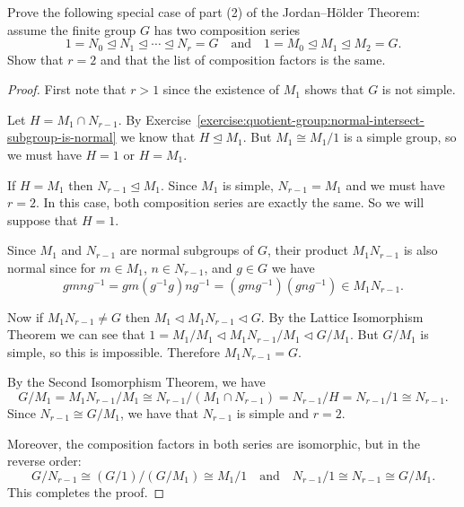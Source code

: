  Prove the following special case of part (2) of the
Jordan--H\"older Theorem: assume the finite group $G$ has two
composition series
\begin{equation*}
  1 = N_0 \trianglelefteq N_1 \trianglelefteq\cdots\trianglelefteq
  N_r = G \quad\text{and}\quad
  1 = M_0\trianglelefteq M_1\trianglelefteq M_2 = G.
\end{equation*}
Show that $r = 2$ and that the list of composition factors is the
same.
\begin{proof}
  First note that $r > 1$ since the existence of $M_1$ shows that $G$
  is not simple.

  Let $H = M_1\cap N_{r-1}$. By
  Exercise~\ref{exercise:quotient-group:normal-intersect-subgroup-is-normal}
  we know that $H\trianglelefteq M_1$. But $M_1\cong M_1/1$ is a simple
  group, so we must have $H = 1$ or $H = M_1$.

  If $H = M_1$ then $N_{r-1}\trianglelefteq M_1$. Since $M_1$ is
  simple, $N_{r-1} = M_1$ and we must have $r = 2$. In this case, both
  composition series are exactly the same. So we will suppose that
  $H = 1$.

  Since $M_1$ and $N_{r-1}$ are normal subgroups of $G$, their product
  $M_1N_{r-1}$ is also normal since for $m\in M_1$, $n\in N_{r-1}$,
  and $g\in G$ we have
  \begin{equation*}
    gmng^{-1} = gm(g^{-1}g)ng^{-1} = (gmg^{-1})(gng^{-1}) \in M_1N_{r-1}.
  \end{equation*}

  Now if $M_1N_{r-1}\neq G$ then
  $M_1\triangleleft M_1N_{r-1}\triangleleft G$. By the Lattice
  Isomorphism Theorem we can see that
  $1 = M_1/M_1 \triangleleft M_1N_{r-1}/M_1 \triangleleft G/M_1$. But
  $G/M_1$ is simple, so this is impossible. Therefore
  $M_1N_{r-1} = G$.

  By the Second Isomorphism Theorem, we have
  \begin{equation*}
    G/M_1 = M_1N_{r-1}/M_1 \cong N_{r-1}/(M_1\cap N_{r-1})
    = N_{r-1}/H = N_{r-1}/1 \cong N_{r-1}.
  \end{equation*}
  Since $N_{r-1}\cong G/M_1$, we have that $N_{r-1}$ is simple and
  $r = 2$.

  Moreover, the composition factors in both series are isomorphic, but
  in the reverse order:
  \begin{equation*}
    G/N_{r-1} \cong (G/1)/(G/M_1) \cong M_1/1
    \quad\text{and}\quad
    N_{r-1}/1 \cong N_{r-1} \cong G/M_1.
  \end{equation*}
  This completes the proof.
\end{proof}
